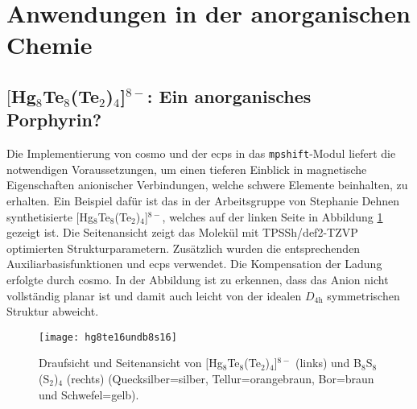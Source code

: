 \section{Anwendungen in der anorganischen Chemie}
\FloatBarrier
\subsection{\texorpdfstring{$[$Hg$_8$Te$_8$(Te$_2$)$_4$]$^{8-}$}{[Hg\_8Te\_8(Te\_2)\_4]8-}: Ein anorganisches Porphyrin?}\label{anorgporh}
Die Implementierung von \ac{cosmo}\supercite{klamt1993cosmo} und der \acp{ecp} in das \texttt{mpshift}-Modul liefert die notwendigen Voraussetzungen, um einen tieferen Einblick in magnetische Eigenschaften anionischer Verbindungen, welche schwere Elemente beinhalten, zu erhalten. Ein Beispiel dafür ist das in der Arbeitsgruppe von Stephanie Dehnen synthetisierte $[$Hg$_8$Te$_8$(Te$_2$)$_4$]$^{8-}$,\supercite{dehnenhg4te8} welches auf der linken Seite in Abbildung \ref{abb:hg8te16undb8s16} gezeigt ist. Die Seitenansicht zeigt das Molekül mit TPSSh\supercite{tao2003climbing}/def2-TZVP\supercite{weigend2005balanced} optimierten Strukturparametern. Zusätzlich wurden die entsprechenden Auxiliarbasisfunktionen\supercite{weigend2006accurate} und \acp{ecp}\supercite{peterson2003systematically} verwendet. Die Kompensation der Ladung erfolgte durch \ac{cosmo}. In der Abbildung ist zu erkennen, dass das Anion nicht vollständig planar ist und damit auch leicht von der idealen $D_{4\textrm{h}}$ symmetrischen Struktur abweicht. 
\begin{figure}[ht!]
	\centering
	\texttt{[image: hg8te16undb8s16]}
	\captionsetup{figurewithin = chapter}
	\captionsetup{font=small, labelfont=bf}\caption[{Abbildung von $[$Hg$_8$Te$_8$(Te$_2$)$_4$]$^{8-}$ und B$_8$S$_8$(S$_2$)$_4$}]{Draufsicht und Seitenansicht von $[$Hg$_8$Te$_8$(Te$_2$)$_4$]$^{8-}$ (links) und B$_8$S$_8$(S$_2$)$_4$ (rechts) (Quecksilber=silber, Tellur=orangebraun, Bor=braun und Schwefel=gelb).}
\label{abb:hg8te16undb8s16}
\end{figure}

